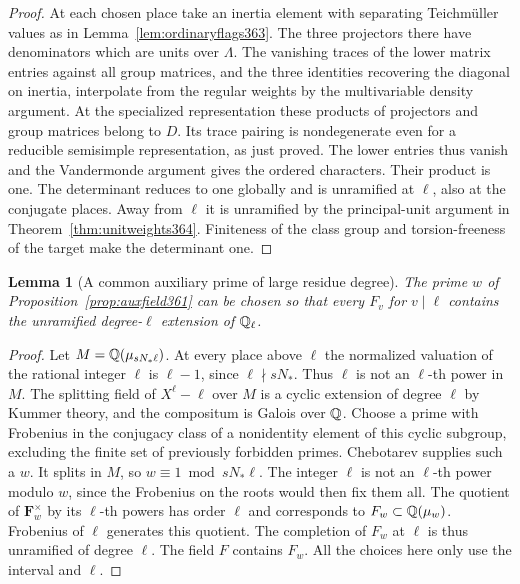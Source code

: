 \documentclass[a4paper,11pt]{article}
\newtheorem{lemma}[proposition]{Lemma}
\theoremstyle{definition}
\theoremstyle{remark}
\numberwithin{equation}{section}
\begin{document}
\begin{proof}
At each chosen place take an inertia element with separating
Teichm\"uller values as in Lemma~\ref{lem:ordinaryflags363}.
The three projectors there have denominators which are units
over \(\Lambda\). The vanishing traces of the lower matrix
entries against all group matrices, and the three identities
recovering the diagonal on inertia, interpolate from the
regular weights by the multivariable density argument.
At the specialized representation these products of projectors
and group matrices belong to \(D\). Its trace pairing is
nondegenerate even for a reducible semisimple representation,
as just proved. The lower entries thus vanish and the
Vandermonde argument gives the ordered characters. Their
product is one. The determinant reduces to one globally and
is unramified at \(\ell\), also at the conjugate places.
Away from \(\ell\) it is unramified by the principal-unit
argument in Theorem~\ref{thm:unitweights364}. Finiteness of
the class group and torsion-freeness of the target make the
determinant one.
\end{proof}

\begin{lemma}[A common auxiliary prime of large residue degree]
\label{lem:inertaux364}
The prime \(w\) of Proposition~\ref{prop:auxfield361} can
be chosen so that every \(F_v\) for \(v\mid\ell\) contains
the unramified degree-\(\ell\) extension of \(\mathbb Q_\ell\).
\end{lemma}
\begin{proof}
Let \(M=\mathbb Q(\mu_{sN_*\ell})\). At every place above \(\ell\)
the normalized valuation of the rational integer \(\ell\)
is \(\ell-1\), since \(\ell\nmid sN_*\). Thus \(\ell\) is
not an \(\ell\)-th power in \(M\). The splitting field of
\(X^\ell-\ell\) over \(M\) is a cyclic extension of degree
\(\ell\) by Kummer theory, and the compositum is Galois over
\(\mathbb Q\). Choose a prime with Frobenius in the conjugacy class
of a nonidentity element of this cyclic subgroup, excluding
the finite set of previously forbidden primes. Chebotarev
supplies such a \(w\). It splits in \(M\), so
\(w\equiv1\bmod sN_*\ell\). The integer \(\ell\) is not an
\(\ell\)-th power modulo \(w\), since the Frobenius on the roots
would then fix them all. The quotient of \(\mathbf F_w^\times\)
by its \(\ell\)-th powers has order \(\ell\) and corresponds
to \(F_w\subset\mathbb Q(\mu_w)\). Frobenius of \(\ell\) generates
this quotient. The completion of \(F_w\) at \(\ell\) is thus
unramified of degree \(\ell\). The field \(F\) contains \(F_w\).
All the choices here only use the interval and \(\ell\).
\end{proof}
\end{document}
